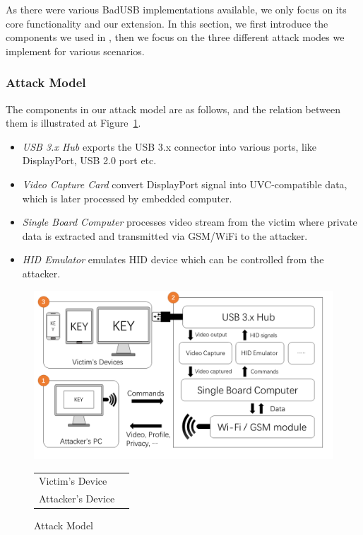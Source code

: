 As there were various BadUSB implementations available, we only focus on its
core functionality and our extension. In this section, we first introduce the
components we used in \tool, then we focus on the three different attack modes
we implement for various scenarios.

\subsubsection{Attack Model}

The components in our attack model are as follows, and the relation between
them is illustrated at Figure~\ref{fig:attack_model}. 

\begin{itemize}
	\item\textit{USB 3.x Hub} exports the USB 3.x connector into various ports, like DisplayPort, USB 2.0 port etc.
	\item\textit{Video Capture Card} convert DisplayPort signal into UVC-compatible data, which is later processed by embedded computer.
	\item\textit{Single Board Computer} processes video stream from the victim where private data is extracted and transmitted via GSM/WiFi to the attacker.
	\item\textit{HID Emulator} emulates HID device which can be controlled from the attacker.
\end{itemize}


\begin{figure}[t]
	\centering
	\includegraphics[width=\linewidth]{./Figs/attack_model.png}

	\begin{tabular}{ll}
	\mycircled{1}Victim's Device    &\mycircled{2}\tool\\
	\mycircled{3}Attacker's Device
	\end{tabular}

	\caption{Attack Model}%
	\label{fig:attack_model}
\end{figure}

